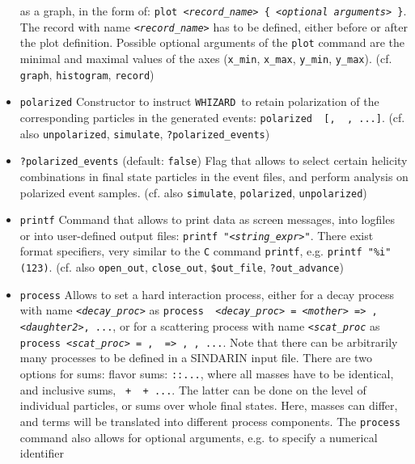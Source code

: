 \documentclass[12pt]{book}
\newcommand{\ttt}[1]{\texttt{#1}}
\newcommand{\whizard}{\texttt{WHIZARD}}
\begin{document}
\begin{itemize}
as a graph, in the form of: \ttt{plot {\em <record\_name>} \{ {\em <optional
arguments>} \}}. The record with name \ttt{{\em <record\_name>}} has to be
defined, either before or after the plot definition. Possible optional
arguments of the \ttt{plot} command are the minimal and maximal values
of the axes (\ttt{x\_min}, \ttt{x\_max}, \ttt{y\_min}, \ttt{y\_max}). 
(cf. \ttt{graph}, \ttt{histogram}, \ttt{record})
\item
\ttt{polarized} \newline
Constructor to instruct \whizard\ to retain polarization of the
corresponding particles in the generated events: \ttt{polarized {\em <prt1>}
  [, {\em <prt2>} , ...]}. (cf. also \ttt{unpolarized}, \ttt{simulate},
\ttt{?polarized\_events})
\item
\ttt{?polarized\_events} \qquad (default: \ttt{false}) \newline
Flag that allows to select certain helicity combinations in final
state particles in the event files, and perform analysis on polarized
event samples. (cf. also \ttt{simulate}, \ttt{polarized}, \ttt{unpolarized})
\item
\ttt{printf} \newline
Command that allows to print data as screen messages, into logfiles or
into user-defined output files: \ttt{printf "{\em <string\_expr>}"}. There
exist format specifiers, very similar to the \ttt{C} command
\ttt{printf}, e.g. \ttt{printf "\%i" (123)}. (cf. also
\ttt{open\_out}, \ttt{close\_out}, \ttt{\$out\_file},
\ttt{?out\_advance}) 
\item
\ttt{process} \newline
Allows to set a hard interaction process, either for a decay process
with name \ttt{{\em <decay\_proc>}} as \ttt{process {\em
<decay\_proc>} = {\em <mother>} => {\em <daughter1>}, {\em
<daughter2>}, ...}, or for a scattering process 
with name \ttt{{\em <scat\_proc}} as \ttt{process {\em <scat\_proc>} =
{\em <in1>}, {\em <in2>} => {\em <out1>}, {\em <out2>}, ...}. Note
that there can be arbitrarily many processes to be defined in a  
SINDARIN input file. There are two options for sums: flavor sums:
\ttt{{\em <prt1>}:{\em <prt2>}:...}, where all masses have to be identical, and
inclusive sums, \ttt{{\em <prt1>} + {\em <prt2>} + ...}. The latter can be done on
the level of individual particles, or sums over whole final
states. Here, masses can differ, and terms will be translated into
different process components. The \ttt{process} command also allows for
optional arguments, e.g. to specify a numerical identifier 

\end{itemize}
\end{document}
